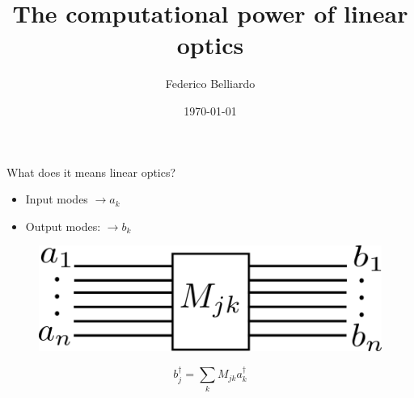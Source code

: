 \documentclass{beamer}
\title[The computational power of linear optics]{The computational power of linear optics} %
\author[Federico Belliardo]
{
Federico Belliardo\\
\vspace{10pt}
}
\institute[Unipi] %
{
Università di Pisa\\ %
\medskip
}
\date{\today} %
\begin{document}
\begin{frame}
\titlepage %
\end{frame}

\begin{frame}
\begin{center}

\begin{block}{}
\begin{center}
What does it means linear optics?
\end{center}
\end{block}

\begin{itemize}
\item Input modes $\rightarrow a_k$\\
\item Output modes: $\rightarrow b_k$
\end{itemize}

\begin{figure}[!htb]
\centering
\includegraphics[scale=.4]{immagini/IO.png}
\end{figure}
\begin{equation*}
b_j^{\dagger} = \sum_{k} M_{jk} a_k^{\dagger} 
\end{equation*}


\end{center}
\end{frame}
\end{document}
